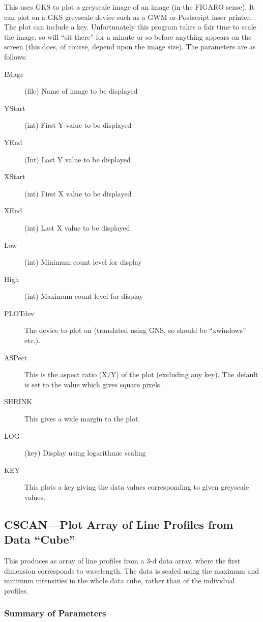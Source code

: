 This uses GKS to plot a greyscale image of an image (in the FIGARO
sense). It can plot on a GKS greyscale device such as a GWM or
Postscript laser printer.
The plot can include a key. Unfortunately this
program takes a fair time to scale the image, so will ``sit there''
for a minute or so before anything appears on the screen (this does, of
course, depend upon the image size). The parameters are as follows:
\begin{description}
\item[IMage] (file) Name of image to be displayed
\item[YStart] (int) First Y value to be displayed
\item[YEnd] (Int) Last Y value to be displayed
\item[XStart] (int) First X value to be displayed
\item[XEnd] (int) Last X value to be displayed
\item[Low] (int) Minimum count level for display
\item[High] (int) Maximum count level for display
\item[PLOTdev] The device to plot on (translated using GNS, so
should be ``xwindows'' etc.).
\item[ASPect] This is the aspect ratio (X/Y) of the plot (excluding
any key). The default is set to the value which gives square pixels.
\item[SHRINK] This gives a wide margin to the plot.
\item[LOG] (key) Display using logarithmic scaling
\item[KEY] This plots a key giving the data values corresponding to
given greyscale values.
\end{description}

\subsection{CSCAN---Plot Array of Line Profiles from Data ``Cube''}

This produces as array of line profiles from a 3-d data array, where
the first dimension corresponds to wavelength. The data is scaled using
the maximum and minimum intensities in the whole data cube, rather than
of the individual profiles.

\subsubsection{Summary of Parameters}

